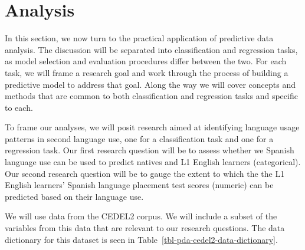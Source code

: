 \documentclass[
  letterpaper,
]{latex/krantz}
\theoremstyle{definition}
\theoremstyle{remark}
\begin{document}
\section{Analysis}\label{sec-pda-analysis}

In this section, we now turn to the practical application of predictive
data analysis. The discussion will be separated into classification and
regression tasks, as model selection and evaluation procedures differ
between the two. For each task, we will frame a research goal and work
through the process of building a predictive model to address that goal.
Along the way we will cover concepts and methods that are common to both
classification and regression tasks and specific to each.

To frame our analyses, we will posit research aimed at identifying
language usage patterns in second language use, one for a classification
task and one for a regression task. Our first research question will be
to assess whether we Spanish language use can be used to predict natives
and L1 English learners (categorical). Our second research question will
be to gauge the extent to which the the L1 English learners' Spanish
language placement test scores (numeric) can be predicted based on their
language use.

We will use data from the CEDEL2 corpus. We will include a subset of the
variables from this data that are relevant to our research questions.
The data dictionary for this dataset is seen in
Table~\ref{tbl-pda-cedel2-data-dictionary}.
\end{document}
